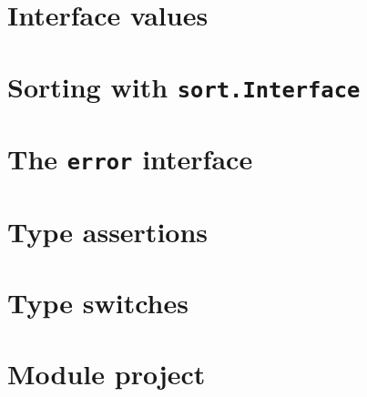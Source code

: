 \documentclass[]{book}
\begin{document}
\hypertarget{interface-values}{%
\section{Interface values}\label{interface-values}}

\hypertarget{sorting-with-sort.interface}{%
\section{\texorpdfstring{Sorting with \texttt{sort.Interface}}{Sorting with sort.Interface}}\label{sorting-with-sort.interface}}

\hypertarget{the-error-interface}{%
\section{\texorpdfstring{The \texttt{error} interface}{The error interface}}\label{the-error-interface}}

\hypertarget{type-assertions}{%
\section{Type assertions}\label{type-assertions}}

\hypertarget{type-switches}{%
\section{Type switches}\label{type-switches}}

\hypertarget{module-project-4}{%
\section*{Module project}\label{module-project-4}}
\end{document}
